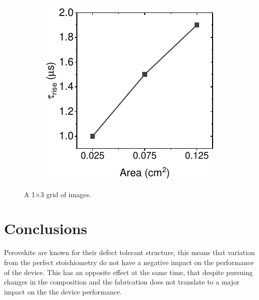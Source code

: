 \begin{figure}[htbp]
\begin{subfigure}{0.3\textwidth}
        \caption{}
        \label{}
    \end{subfigure}
    \hfill
    \begin{subfigure}{0.29\textwidth}
        \centering
        \includegraphics[width=\textwidth]{chapters/transport_layers/images/Rise_time_farea.pdf}
        \caption{}
        \label{}
    \end{subfigure}
    
    \caption{A 1×3 grid of images.}
    \label{}
\end{figure}



\section{Conclusions}

Perovskite are known for their defect tolerant structure, this means that variation from the perfect stoichiometry do not have a negative impact on the performance of the device. This has an opposite effect at the same time, that despite pursuing changes in the composition and the fabrication does not translate to a major impact on the the device performance. 


\cleardoublepage

